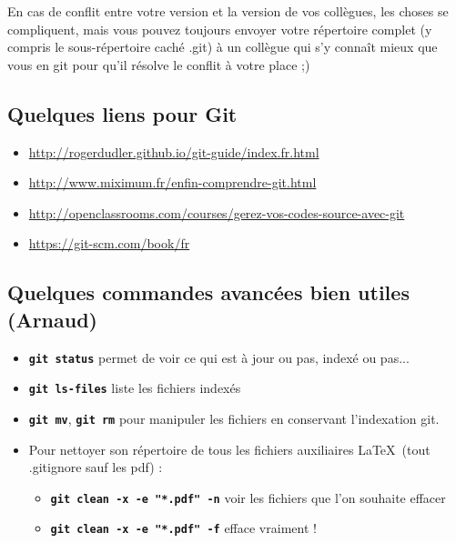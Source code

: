 \documentclass[11pt]{article} %
\newcommand{\cmd}[1]{\textbf{\texttt{\color{red!70!black}#1}}}
\begin{document}
En cas de conflit entre votre version et la version de vos collègues, les choses se compliquent, mais vous pouvez toujours envoyer votre répertoire complet (y compris le sous-répertoire caché .git) à un collègue qui s'y connaît mieux que vous en git pour qu'il résolve le conflit à votre place ;)

\subsection{Quelques liens pour Git}

\begin{itemize}
  \item \url{http://rogerdudler.github.io/git-guide/index.fr.html}
  \item \url{http://www.miximum.fr/enfin-comprendre-git.html}
  \item \url{http://openclassrooms.com/courses/gerez-vos-codes-source-avec-git}
  \item \url{https://git-scm.com/book/fr}
\end{itemize}


\subsection{Quelques commandes avancées bien utiles (Arnaud)}

\begin{itemize}
  \item \cmd{git status} permet de voir ce qui est à jour ou pas, indexé ou pas...
  \item \cmd{git ls-files} liste les fichiers indexés
  \item \cmd{git mv}, \cmd{git rm} pour manipuler les fichiers en conservant l'indexation git.
  \item Pour nettoyer son répertoire de tous les fichiers auxiliaires \LaTeX\ (tout .gitignore sauf les pdf) :
  \begin{itemize}
    \item \cmd{git clean -x -e "*.pdf" -n} voir les fichiers que l'on souhaite effacer 
    \item \cmd{git clean -x -e "*.pdf" -f} efface vraiment !
  \end{itemize}
\end{itemize}



\end{document}
